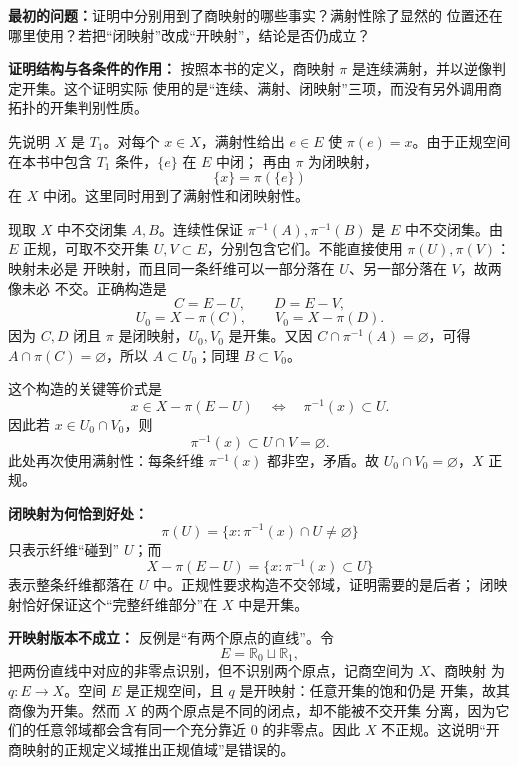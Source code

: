 \documentclass[11pt,a4paper]{ctexart}
\begin{document}
\textbf{最初的问题：}证明中分别用到了商映射的哪些事实？满射性除了显然的
位置还在哪里使用？若把“闭映射”改成“开映射”，结论是否仍成立？

\textbf{证明结构与各条件的作用：}
按照本书的定义，商映射 $\pi$ 是连续满射，并以逆像判定开集。这个证明实际
使用的是“连续、满射、闭映射”三项，而没有另外调用商拓扑的开集判别性质。

先说明 $X$ 是 $T_1$。对每个 $x\in X$，满射性给出 $e\in E$ 使
$\pi(e)=x$。由于正规空间在本书中包含 $T_1$ 条件，$\{e\}$ 在 $E$ 中闭；
再由 $\pi$ 为闭映射，
\[
  \{x\}=\pi(\{e\})
\]
在 $X$ 中闭。这里同时用到了满射性和闭映射性。

现取 $X$ 中不交闭集 $A,B$。连续性保证
$\pi^{-1}(A),\pi^{-1}(B)$ 是 $E$ 中不交闭集。由 $E$ 正规，可取不交开集
$U,V\subset E$，分别包含它们。不能直接使用 $\pi(U),\pi(V)$：映射未必是
开映射，而且同一条纤维可以一部分落在 $U$、另一部分落在 $V$，故两像未必
不交。正确构造是
\[
 C=E-U,\qquad D=E-V,
\]
\[
 U_0=X-\pi(C),\qquad V_0=X-\pi(D).
\]
因为 $C,D$ 闭且 $\pi$ 是闭映射，$U_0,V_0$ 是开集。又因
$C\cap\pi^{-1}(A)=\varnothing$，可得 $A\cap\pi(C)=\varnothing$，所以
$A\subset U_0$；同理 $B\subset V_0$。

这个构造的关键等价式是
\[
 x\in X-\pi(E-U)
 \quad\Longleftrightarrow\quad
 \pi^{-1}(x)\subset U.
\]
因此若 $x\in U_0\cap V_0$，则
\[
 \pi^{-1}(x)\subset U\cap V=\varnothing.
\]
此处再次使用满射性：每条纤维 $\pi^{-1}(x)$ 都非空，矛盾。故
$U_0\cap V_0=\varnothing$，$X$ 正规。

\textbf{闭映射为何恰到好处：}
\[
 \pi(U)=\{x:\pi^{-1}(x)\cap U\ne\varnothing\}
\]
只表示纤维“碰到” $U$；而
\[
 X-\pi(E-U)=\{x:\pi^{-1}(x)\subset U\}
\]
表示整条纤维都落在 $U$ 中。正规性要求构造不交邻域，证明需要的是后者；
闭映射恰好保证这个“完整纤维部分”在 $X$ 中是开集。

\textbf{开映射版本不成立：}
反例是“有两个原点的直线”。令
\[
 E=\mathbb R_0\sqcup\mathbb R_1,
\]
把两份直线中对应的非零点识别，但不识别两个原点，记商空间为 $X$、商映射
为 $q:E\to X$。空间 $E$ 是正规空间，且 $q$ 是开映射：任意开集的饱和仍是
开集，故其商像为开集。然而 $X$ 的两个原点是不同的闭点，却不能被不交开集
分离，因为它们的任意邻域都会含有同一个充分靠近 $0$ 的非零点。因此 $X$
不正规。这说明“开商映射的正规定义域推出正规值域”是错误的。

\end{document}
